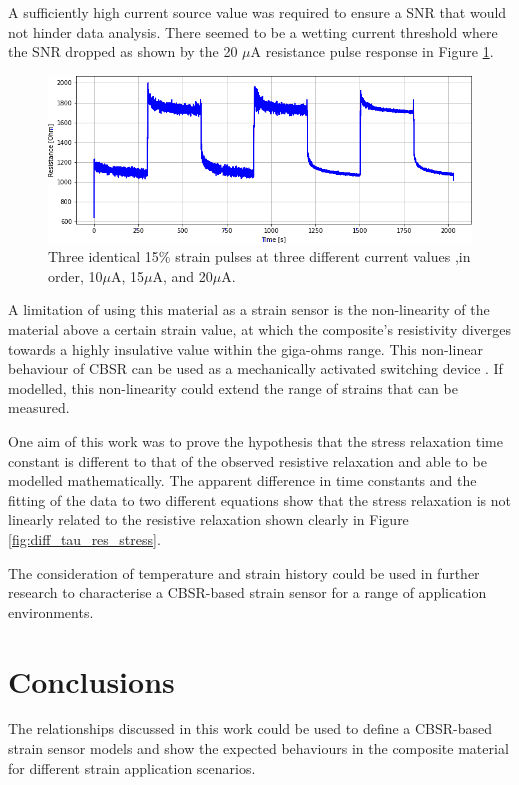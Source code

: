 A sufficiently high current source value was required to ensure a SNR that would not hinder data analysis. There seemed to be a wetting current threshold where the SNR dropped as shown by the 20 $\mu$A resistance pulse response in Figure \ref{fig:multi_current}.
\begin{figure}[H]
	\centering
	\includegraphics[width=0.7\linewidth]{Figures/test_multicurrent_2_7-5_v3_res_only.png}
	\caption{Three identical 15\% strain pulses at three different current values ,in order, 10$\mu$A, 15$\mu$A, and 20$\mu$A.}
	\label{fig:multi_current}
\end{figure}


A limitation of using this material as a strain sensor is the non-linearity of the material above a certain strain value, at which the composite's resistivity diverges towards a highly insulative value within the giga-ohms range. This non-linear behaviour of CBSR can be used as a mechanically activated switching device \cite{Henke2018}. If modelled, this non-linearity could extend the range of strains that can be measured.

One aim of this work was to prove the hypothesis that the stress relaxation time constant is different to that of the observed resistive relaxation and able to be modelled mathematically. The apparent difference in time constants and the fitting of the data to two different equations show that the stress relaxation is not linearly related to the resistive relaxation shown clearly in Figure \ref{fig:diff_tau_res_stress}.

 The consideration of temperature and strain history \cite{Fung1993} could be used in further research to characterise a CBSR-based strain sensor for a range of application environments.

\section{Conclusions}
The relationships discussed in this work could be used to define a CBSR-based strain sensor models and show the expected behaviours in the composite material for different strain application scenarios. 

